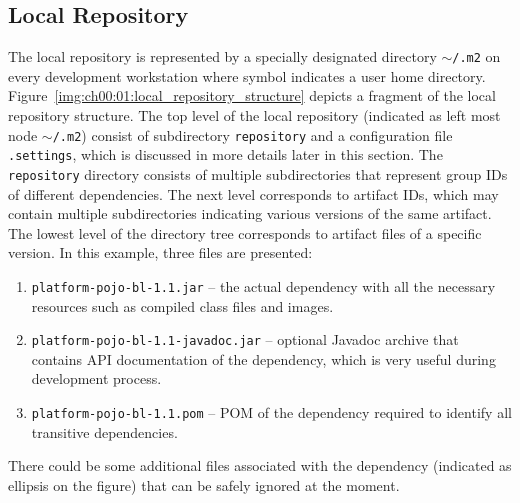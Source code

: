   \subsection*{Local Repository}
  The local repository is represented by a specially designated directory \texttt{$\sim$/.m2} on every development workstation where symbol \tikzinline{$\sim$} indicates a user home directory.
  Figure~\ref{img:ch00:01:local_repository_structure} depicts a fragment of the local repository structure.
  The top level of the local repository (indicated as left most node \texttt{$\sim$/.m2}) consist of subdirectory \texttt{repository} and a configuration file \texttt{.settings}, which is discussed in more details later in this section.
  The \texttt{repository} directory consists of multiple subdirectories that represent group IDs of different dependencies.
  The next level corresponds to artifact IDs, which may contain multiple subdirectories indicating various versions of the same artifact.
  The lowest level of the directory tree corresponds to artifact files of a specific version.
  In this example, three files are presented:
  \begin{enumerate}
    \item \texttt{platform-pojo-bl-1.1.jar} -- the actual dependency with all the necessary resources such as compiled class files and images.
    \item \texttt{platform-pojo-bl-1.1-javadoc.jar} -- optional Javadoc archive that contains API documentation of the dependency, which is very useful during development process.
    \item \texttt{platform-pojo-bl-1.1.pom} -- POM of the dependency required to identify all transitive dependencies.
  \end{enumerate}
  There could be some additional files associated with the dependency (indicated as ellipsis on the figure) that can be safely ignored at the moment.

